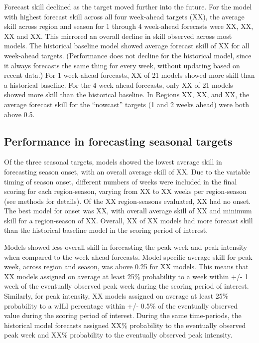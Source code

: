 \documentclass{article}\usepackage[]{graphicx}\usepackage[]{color}
\begin{document}
Forecast skill declined as the target moved further into the future.
For the model with highest forecast skill across all four week-ahead targets (XX), the average skill across region and season for 1 through 4 week-ahead forecasts were XX, XX, XX and XX.
This mirrored an overall decline in skill observed across most models.
The historical baseline model showed average forecast skill of XX for all week-ahead targets. (Performance does not decline for the historical model, since it always forecasts the same thing for every week, without updating based on recent data.)
For 1 week-ahead forecasts, XX of 21 models showed more skill than a historical baseline. 
For the 4 week-ahead forecasts, only XX of 21 models showed more skill than the historical baseline.
In Regions XX, XX, and XX, the average forecast skill for the ``nowcast'' targets (1 and 2 weeks ahead) were both above 0.5.


\subsection{Performance in forecasting seasonal targets}

Of the three seasonal targets, models showed the lowest average skill in forecasting season onset, with an overall average skill of XX. 
Due to the variable timing of season onset, different numbers of weeks were included in the final scoring for each region-season, varying from XX to XX weeks per region-season (see methods for details).
Of the XX region-seasons evaluated, XX had no onset. 
The best model for onset was XX, with overall average skill of XX and minimum skill for a region-season of XX.
Overall, XX of XX models had more forecast skill than the historical baseline model in the scoring period of interest.


Models showed less overall skill in forecasting the peak week and peak intensity when compared to the week-ahead forecasts.
Model-specific average skill for peak week, across region and season, was above 0.25 for XX models. 
This means that XX models assigned on average at least 25\% probability to a week within +/- 1 week of the eventually observed peak week during the scoring period of interest.
Similarly, for peak intensity, XX models assigned on average at least 25\% probability to a wILI percentage within +/- 0.5\% of the eventually observed value during the scoring period of interest.
During the same time-periods, the historical model forecasts assigned XX\% probability to the eventually observed peak week and XX\% probability to the eventually observed peak intensity.
\end{document}
